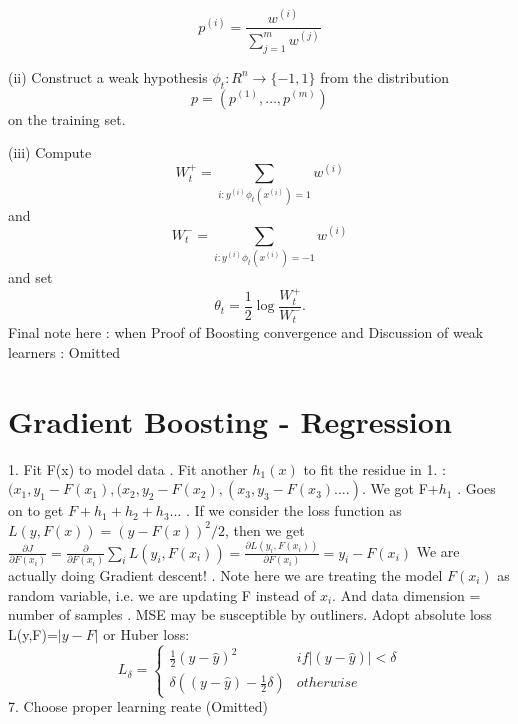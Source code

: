 \documentclass{article}
\begin{document}
\[ p^{(i)} = \frac{w^{(i)}}{\sum_{j=1}^{m} w^{(j)}} \]  

(ii) Construct a weak hypothesis \( \phi_t : R^n \rightarrow \{-1,1\} \) from the distribution 
\[ p = \left( p^{(1)}, \ldots, p^{(m)} \right) \] 
on the training set. \newline

(iii) Compute \[ W^+_t = \sum_{i : y^{(i)} \phi_t (x^{(i)}) = 1} w^{(i)} \] 
and 
\[ W^-_t = \sum_{i : y^{(i)} \phi_t (x^{(i)}) = -1} w^{(i)} \] and set \[ \theta_t = \frac{1}{2} \log \frac{W^+_t}{W^-_t} . \] 
Final note here : when 
Proof of Boosting convergence and Discussion of weak learners : Omitted
\section{Gradient Boosting - Regression}
1. Fit F(x) to model data . Fit another \(h_1(x)\) to fit the residue in 1. : \((x_1,y_1-F(x_1),(x_2,y_2-F(x_2),(x_3,y_3-F(x_3)....)\). We got F+\(h_1\) . Goes on to get \(F+h_1+h_2+h_3...\) \newline 
{}. If we consider the loss function as \(L(y,F(x)) = (y - F(x))^2/2\), then we get \newline
\(\frac{\partial J}{\partial F(x_i)} = \frac{\partial}{\partial F(x_i)} \sum_{i} L(y_i, F(x_i)) = \frac{\partial L(y_i, F(x_i))}{\partial F(x_i)} =  y_i - F(x_i)  \) \newline 
We are actually doing Gradient descent! . Note here we are treating the model \(F(x_i)\) as random variable, i.e. we are updating F instead of \(x_i\). And data dimension = number of samples . MSE may be susceptible by outliners. Adopt absolute loss L(y,F)=\(|y - F|\) or Huber loss: \newline
\[
L_{\delta}=
    \left\{\begin{matrix}
        \frac{1}{2}(y - \hat{y})^{2} & if \left | (y - \hat{y})  \right | < \delta\\
        \delta ((y - \hat{y}) - \frac1 2 \delta) & otherwise
    \end{matrix}\right.
\]
7. Choose proper learning reate (Omitted)
\end{document}
